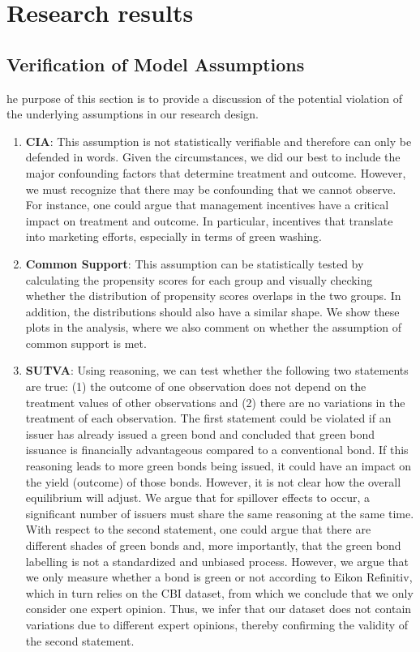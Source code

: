 %
%
\let\textcircled=\pgftextcircled
\chapter{Research results}
\label{chap:intro}

\section{Verification of Model Assumptions}

he purpose of this section is to provide a discussion of the potential violation of the underlying assumptions in our research design.

\begin{enumerate}
    \item \textbf{CIA}: This assumption is not statistically verifiable and therefore can only be defended in words. Given the circumstances, we did our best to include the major confounding factors that determine treatment and outcome. However, we must recognize that there may be confounding that we cannot observe. For instance, one could argue that management incentives have a critical impact on treatment and outcome. In particular, incentives that translate into marketing efforts, especially in terms of green washing.

    \item \textbf{Common Support}: This assumption can be statistically tested by calculating the propensity scores for each group and visually checking whether the distribution of propensity scores overlaps in the two groups. In addition, the distributions should also have a similar shape. We show these plots in the analysis, where we also comment on whether the assumption of common support is met.
    
    \item \textbf{SUTVA}: Using reasoning, we can test whether the following two statements are true: (1) the outcome of one observation does not depend on the treatment values of other observations and (2) there are no variations in the treatment of each observation. The first statement could be violated if an issuer has already issued a green bond and concluded that green bond issuance is financially advantageous compared to a conventional bond. If this reasoning leads to more green bonds being issued, it could have an impact on the yield (outcome) of those bonds. However, it is not clear how the overall equilibrium will adjust. We argue that for spillover effects to occur, a significant number of issuers must share the same reasoning at the same time. With respect to the second statement, one could argue that there are different shades of green bonds and, more importantly, that the green bond labelling is not a standardized and unbiased process. However, we argue that we only measure whether a bond is green or not according to Eikon Refinitiv, which in turn relies on the CBI dataset, from which we conclude that we only consider one expert opinion. Thus, we infer that our dataset does not contain variations due to different expert opinions, thereby confirming the validity of the second statement.


\end{enumerate}

